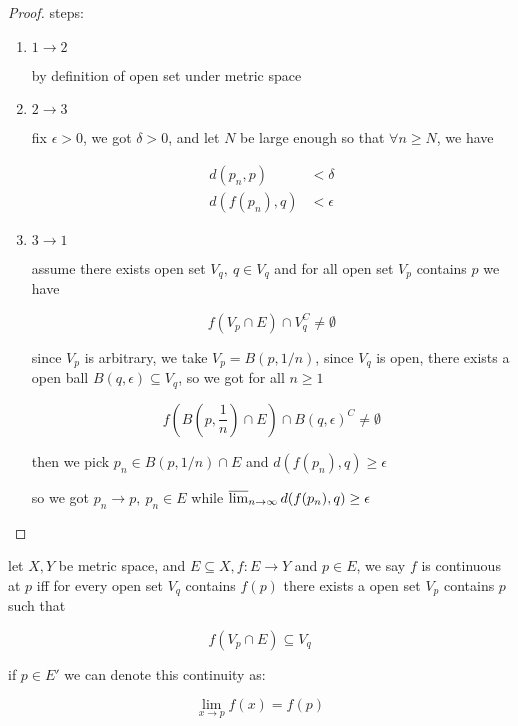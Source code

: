 \begin{proof}
    steps:

    \begin{enumerate}
        \item $1 \to 2$

        by definition of open set under metric space

        \item $2 \to 3$

        fix $\epsilon > 0$, we got $\delta > 0$, and let $N$ be large enough so that $\forall n \ge  N$, we have

        \begin{align*}
            d(p_n, p) &< \delta \\
            d(f(p_n), q) & < \epsilon
        \end{align*}

        \item $3 \to 1$

        assume there exists open set $V_q, \: q \in V_q$ and for all open set $V_p$ contains $p$ we have

        \[
            f(V_p \cap E) \cap V_q^C \ne \emptyset
        \]

        since $V_p$ is arbitrary, we take $V_p = B(p, 1/n)$, since $V_q$ is open, there exists a open ball 
        $B(q, \epsilon) \subseteq V_q$, so we got for all $n \ge 1$

        \[
            f(B(p, \frac{1}{n}) \cap E) \cap B(q, \epsilon)^C \ne \emptyset
        \]

        then we pick $p_n \in B(p, 1/n) \cap E$ and $d(f(p_n), q) \ge \epsilon$

        so we got $p_n \to p,\: p_n \in E$ while $\varlimsup_{n \to \infty}d(f(p_n), q) \ge \epsilon$
    \end{enumerate}
\end{proof}


\begin{definition}[Continuity]
    let $X,Y$ be metric space, and $E \subseteq X, f: E \to Y$ and $p \in E$, we say
    $f$ is continuous at $p$ iff for every open set $V_q$ contains $f(p)$ there exists a open set $V_p$ contains $p$ such that

    \[
        f(V_p \cap E) \subseteq V_q
    \]

    if $p \in E'$ we can denote this continuity as:

    \[
        \lim_{x \to p}f(x) = f(p)
    \]
\end{definition}

